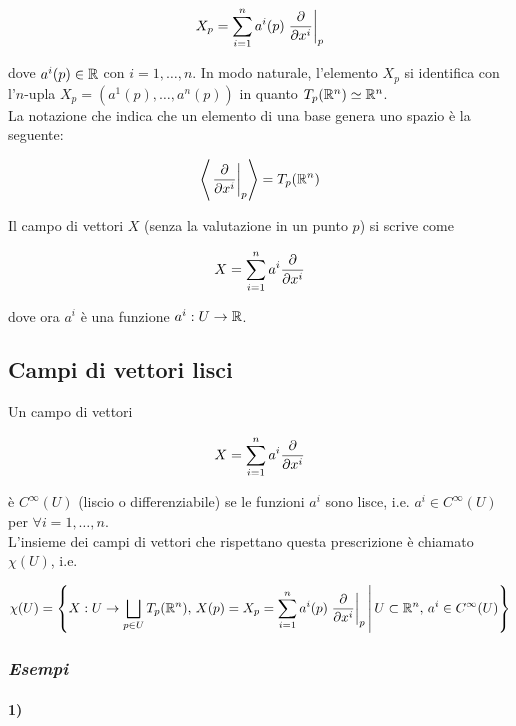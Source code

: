 \begin{equation}
	X_{p} = \sum_{i=1}^{n} a^{i}(p) \eval{ \pdv{x^{i}} }_{p}
\end{equation}

dove $ a^{i}(p) \in \mathbb{R} $ con $ i=1,\dots,n $. In modo naturale, l'elemento $ X_{p} $ si identifica con l'$ n $-upla $ X_{p} = (a^{1}(p),\dots,a^{n}(p)) $ in quanto $ T_{p}(\mathbb{R}^{n}) \simeq \mathbb{R}^{n} $.\\
La notazione che indica che un elemento di una base genera uno spazio è la seguente:

\begin{equation}
	\ev{ \eval{ \pdv{x^{i}} }_{p} } = T_{p}(\R^{n})
\end{equation}

Il campo di vettori $ X $ (senza la valutazione in un punto $ p $) si scrive come

\begin{equation}
	X = \sum_{i=1}^{n} a^{i} \pdv{x^{i}}
\end{equation}

dove ora $ a^{i} $ è una funzione $ a^{i} : U \to \mathbb{R} $.

\subsection{Campi di vettori lisci}

Un campo di vettori

\begin{equation}
	X = \sum_{i=1}^{n} a^{i} \pdv{x^{i}}
\end{equation}

è $ C^{\infty} (U) $ (liscio o differenziabile) se le funzioni $ a^{i} $ sono lisce, i.e. $ a^{i} \in C^{\infty}(U) $ per $ \forall i=1,\dots,n $.\\
L'insieme dei campi di vettori che rispettano questa prescrizione è chiamato $ \chi(U) $, i.e.

\begin{equation}
	\chi(U) = \left\{ X : U \to \bigsqcup_{p \in U} T_{p}(\R^{n}), \, X(p) = X_{p} = \sum_{i=1}^{n} a^{i}(p) \eval{ \pdv{x^{i}} }_{p} \st U \subset \R^{n}, \, a^{i} \in C^{\infty}(U) \right\}
\end{equation}

\subsubsection{\textit{Esempi}}

\paragraph{1)}

